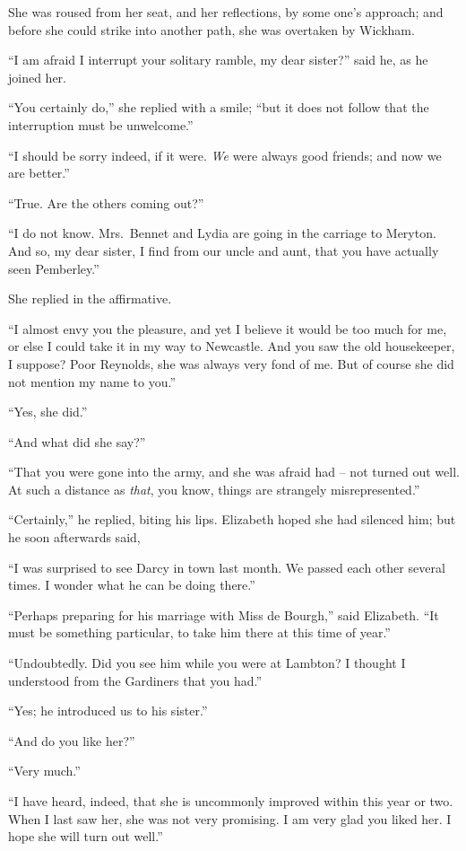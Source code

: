 She was roused from her seat, and her reflections, by
some one’s approach; and before she could strike into
another path, she was overtaken by Wickham.

“I am afraid I interrupt your solitary ramble, my dear
sister?” said he, as he joined her.

“You certainly do,” she replied with a smile; “but
it does not follow that the interruption must be
unwelcome.”

“I should be sorry indeed, if it were. \textit{We} were always
good friends; and now we are better.”

“True. Are the others coming out?”

“I do not know. Mrs.\ Bennet and Lydia are going in
the carriage to Meryton. And so, my dear sister, I find
from our uncle and aunt, that you have actually seen
Pemberley.”

She replied in the affirmative.

“I almost envy you the pleasure, and yet I believe
it would be too much for me, or else I could take it in my
way to Newcastle. And you saw the old housekeeper,
I suppose? Poor Reynolds, she was always very fond of
me. But of course she did not mention my name to you.”

“Yes, she did.”

“And what did she say?”

“That you were gone into the army, and she was
afraid had -- not turned out well. At such a distance as
\textit{that}, you know, things are strangely misrepresented.”

“Certainly,” he replied, biting his lips. Elizabeth
hoped she had silenced him; but he soon afterwards
said,

“I was surprised to see Darcy in town last month. We
passed each other several times. I wonder what he can
be doing there.”

“Perhaps preparing for his marriage with Miss de
Bourgh,” said Elizabeth. “It must be something particular,
to take him there at this time of year.”

“Undoubtedly. Did you see him while you were at
Lamb\-ton? I thought I understood from the Gardiners
that you had.”

“Yes; he introduced us to his sister.”

“And do you like her?”

“Very much.”

“I have heard, indeed, that she is uncommonly improved
within this year or two. When I last saw her, she
was not very promising. I am very glad you liked her.
I hope she will turn out well.”

